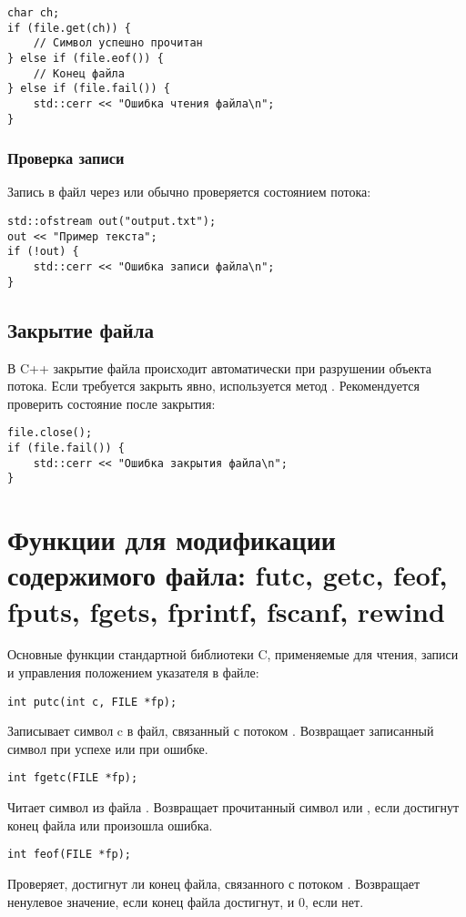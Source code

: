 \begin{verbatim}
char ch;
if (file.get(ch)) {
    // Символ успешно прочитан
} else if (file.eof()) {
    // Конец файла
} else if (file.fail()) {
    std::cerr << "Ошибка чтения файла\n";
}
\end{verbatim}
\subsubsection{Проверка записи}
Запись в файл через  или  обычно проверяется состоянием потока:
\begin{verbatim}
std::ofstream out("output.txt");
out << "Пример текста";
if (!out) {
    std::cerr << "Ошибка записи файла\n";
}
\end{verbatim}

\subsection{Закрытие файла}
В C++ закрытие файла происходит автоматически при разрушении объекта потока. Если требуется
закрыть явно, используется метод .
Рекомендуется проверить состояние после закрытия:
\begin{verbatim}
file.close();
if (file.fail()) {
    std::cerr << "Ошибка закрытия файла\n";
}
\end{verbatim}

\section{Функции для модификации содержимого файла: futc, getc, feof, fputs, fgets, fprintf, fscanf, rewind}
Основные функции стандартной библиотеки C, применяемые для чтения, записи и управления положением указателя в файле:

\begin{verbatim}
int putc(int c, FILE *fp);
\end{verbatim}
Записывает символ c в файл, связанный с потоком . Возвращает записанный символ при успехе или  при ошибке.

\begin{verbatim}
int fgetc(FILE *fp);
\end{verbatim}
Читает символ из файла . Возвращает прочитанный символ или , если достигнут конец файла или произошла ошибка.

\begin{verbatim}
int feof(FILE *fp);
\end{verbatim}
Проверяет, достигнут ли конец файла, связанного с потоком . Возвращает ненулевое значение, если конец файла достигнут, и 0, если нет.

